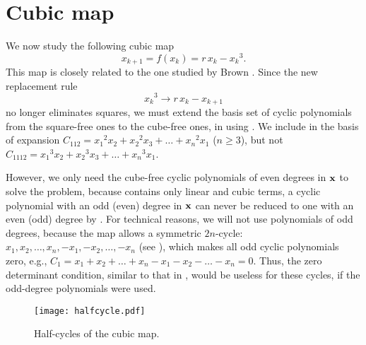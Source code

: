 \documentclass[twocolumn]{revtex4-1}
\begin{document}
\section{\label{sec:cubic}Cubic map}


We now study the following cubic map \cite{strogatz}
\begin{equation}
  x_{k + 1} = f(x_k) = r \, x_k - {x_k}^3.
\label{eq:cubic}
\end{equation}
This map is closely related to the one studied by Brown \cite{may2, brown3}.
Since the new replacement rule
\begin{equation}
  {x_k}^3 \rightarrow r \, x_k - x_{k+1}
\label{eq:cubreplace}
\end{equation}
no longer eliminates squares,
%
we must extend the basis set of cyclic polynomials
  from the square-free ones to the cube-free ones,
  in using .
We include in the basis of expansion
  $C_{112} = {x_1}^2 x_2 + {x_2}^2 x_3 + \dots + {x_n}^2 x_1$ ($n\ge3$),
but not
  $C_{1112} = {x_1}^3 x_2 + {x_2}^3 x_3 + \dots + {x_n}^3 x_1$.

%
However, we only need the cube-free cyclic polynomials of even degrees in $\mathbf{x}$
to solve the problem,
%
because  contains only linear and cubic terms,
a cyclic polynomial with an odd (even) degree in $\mathbf{x}$
can never be reduced to one with an even (odd) degree
by .
%
%
For technical reasons, we will not use polynomials of odd degrees,
because the map allows a symmetric $2n$-cycle:
$x_1, x_2, \ldots, x_n, -x_1, -x_2, \ldots, -x_n$
(see ),
which makes all odd cyclic polynomials zero,
e.g., $C_1 = x_1 + x_2 + \dots + x_n - x_1 - x_2 - \dots - x_n = 0$.
%
Thus, the zero determinant condition, similar to that in ,
  would be useless for these cycles,
  if the odd-degree polynomials were used.



\begin{figure}[h]
  \begin{minipage}{\linewidth}
    \begin{center}
        \texttt{[image: halfcycle.pdf]}
    \end{center}
  \end{minipage}%
  \caption{\label{fig:halfcycle}
  Half-cycles of the cubic map.}
\end{figure}
\end{document}
